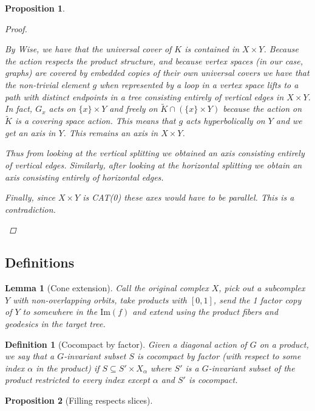 \documentclass{article}
\theoremstyle{mystyle}
\newtheorem{lem}{Lemma}[section]
\newtheorem{pro}{Proposition}
\newtheorem{defn}{Definition}
\theoremstyle{remark}
\begin{document}
\begin{pro}
\begin{proof}
\begin{enumerate}
    By Wise, we have that the universal cover of $K$ is contained in $X \times Y$. Because the action respects the product structure, and because vertex spaces (in our case, graphs) are covered by embedded copies of their own universal covers we have that the non-trivial element $g$ when represented by a loop in a vertex space lifts to a path with distinct endpoints in a tree consisting entirely of vertical edges in $X \times Y$. In fact, $G_x$ acts on $\{x\}\times Y$ and freely on $\widetilde{K} \cap (\{x\}\times Y)$ because the action on $\widetilde{K}$ is a covering space action. This means that $g$ acts hyperbolically on $Y$ and we get an axis in $Y$. This remains an axis in $X \times Y$.
    
    Thus from looking at the vertical splitting  we obtained an axis consisting entirely of vertical edges. Similarly, after looking at the horizontal splitting we obtain an axis consisting entirely of horizontal edges. 
    
    Finally, since $X \times Y$ is CAT(0) these axes would have to be parallel. This is a contradiction.
\end{enumerate}
\end{proof}
\end{pro}




\subsection{Definitions}


\begin{lem}
    [Cone extension]
    \label{lem:coneextension} 
    Call the original complex \(X\), pick out a subcomplex \(Y\) with non-overlapping orbits, take products with \([0,1]\), send the 1 factor copy of \(Y\) to somewhere in the \(\text{Im}(f)\) and extend using the product fibers and geodesics in the target tree.
\end{lem}

\begin{defn}
    [Cocompact by factor]
    \label{defn:cocompactcrossfactor} 
    Given a diagonal action of \(G\) on a product, we say that a \(G\)-invariant subset \(S\) is cocompact by factor (with respect to some index \(\alpha\) in the product) if \(S \subseteq  S' \times X_{\alpha}\) where \(S'\) is a \(G\)-invariant subset of the product restricted to every index except \(\alpha\) and \(S'\) is cocompact.
\end{defn}

\begin{pro}
    [Filling respects slices]
    \label{pro:fillingrespectsslices} 
\end{pro}
\end{document}
